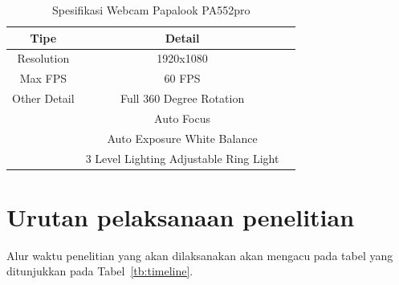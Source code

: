 \begin{longtable}{|c|c|c|}
  \caption{Spesifikasi Webcam Papalook PA552pro}
  \label{tb:spesifikasiwebcam}                           \\
  \hline
  \textbf{Tipe} & \textbf{Detail}                        \\
  \hline
  Resolution    & 1920x1080                              \\
  Max FPS       & 60 FPS                                 \\
  Other Detail  & Full 360 Degree Rotation               \\
                & Auto Focus                             \\
                & Auto Exposure White Balance            \\
                & 3 Level Lighting Adjustable Ring Light \\
  \hline
\end{longtable}

\section{Urutan pelaksanaan penelitian}

Alur waktu penelitian yang akan dilaksanakan akan mengacu pada tabel yang ditunjukkan pada Tabel~\ref{tb:timeline}.

